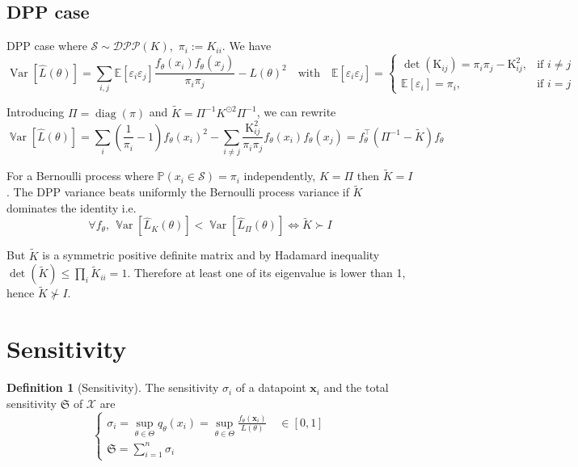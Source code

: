 \documentclass{article}
\renewcommand{\epsilon}{\varepsilon}
\newcommand{\Var}{\operatorname{\mathbb V ar}}
\theoremstyle{definition}
\newtheorem{definition}{Definition}[section]
\begin{document}
\subsection{DPP case}
DPP case where $ \mathcal S \sim \mathcal{DPP}(K)$, \,$\pi_i := K_{ii}$. We have
$$
\operatorname{Var}[\hat L(\theta)]
=\sum_{i, j}\mathbb{E}\left[\epsilon_{i} \epsilon_{j}\right] \frac{f_\theta(x_{i}) f_\theta(x_{j})} {\pi_{i} \pi_{j}}  - L(\theta)^{2}
\quad \text{with} \quad
\mathbb{E}\left[\epsilon_{i} \epsilon_{j}\right]=
\begin{cases}
	\det\left(\mathrm{K}_{ij}\right)=\pi_{i} \pi_{j}-\mathrm{K}_{i j}^{2}, & \text{if } i \neq j \\
	\mathbb{E}\left[\epsilon_{i}\right]=\pi_{i}, & \text{if } i = j
\end{cases}
$$



Introducing $\Pi = \operatorname{diag}(\pi)$ and $\tilde K = \Pi^{-1}K^{\odot 2} \Pi^{-1}$, we can rewrite  
$$
\Var [\hat L(\theta)]=\sum_{i}\left(\frac{1}{\pi_{i}}-1\right) f_\theta(x_{i})^{2}-\sum_{i \neq j} \frac{\mathrm{K}_{i j}^{2}}{\pi_{i} \pi_{j}} f_\theta(x_{i}) f_\theta(x_{j}) =  f_\theta^\top (\Pi^{-1}  - \tilde{K}) f_\theta 
$$

	
For a Bernoulli process where $\mathbb P(x_i \in \mathcal S) = \pi_i$ independently, $K = \Pi$ then $\tilde K = I$. The DPP variance beats uniformly the Bernoulli process variance if $\tilde K$ dominates the identity i.e. 
$$ \forall f_\theta, \, \Var [\hat L_{K}(\theta)] < \Var [\hat L_{\Pi}(\theta)] \iff \tilde K \succ I$$

But $\tilde K$ is a symmetric positive definite matrix and by Hadamard inequality $\det( \tilde K) \leq \prod_{i} \tilde K_{ii}= 1$. Therefore at least one of its eigenvalue is lower than 1, hence $\tilde K \nsucc I$.
	
	

\section{Sensitivity}
\begin{definition}[Sensitivity]
	The sensitivity $\sigma_i$ of a datapoint $\boldsymbol{x}_{i}$ and the total sensitivity $\mathfrak S$ of $\mathcal X$ are
	$$
	\begin{cases}
		\sigma_{i}=\sup_{\theta \in \Theta} q_{\theta}(x_i) = \sup _{\theta \in \Theta} \frac{f_{\theta}\left(\boldsymbol{x}_{i}\right)}{L(\theta)} \quad \in[0,1]\\
		\mathfrak{S}=\sum_{i=1}^{n} \sigma_{i}
	\end{cases}
	$$
\end{definition} 
\end{document}
